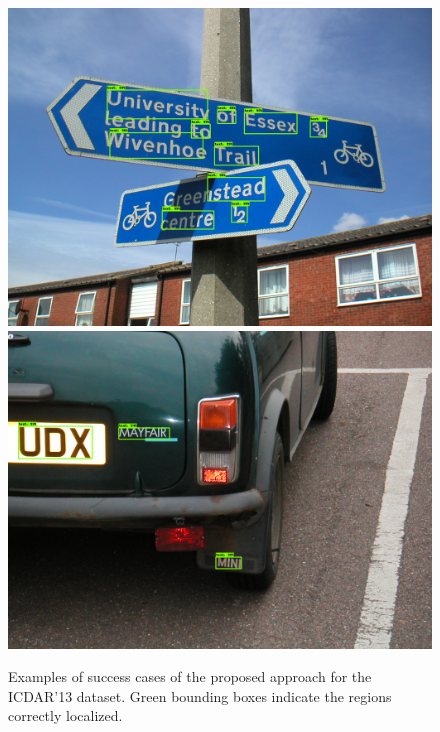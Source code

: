 \begin{figure}[!h]
    \includegraphics[height=0.20\textheight]{VISAPP/figs/qualitative-results/icdar13/129.png}
    \includegraphics[height=0.20\textheight]{VISAPP/figs/qualitative-results/icdar13/140.png}
	\caption{Examples of success cases of the proposed approach for the ICDAR'13 dataset. Green bounding boxes indicate the regions correctly localized.}
	\label{fig:qualitative-results-good-13}
\end{figure}
